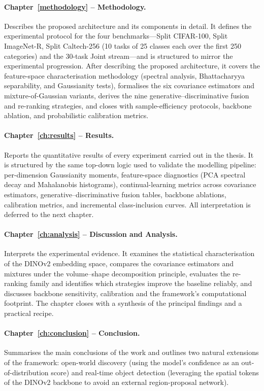 \paragraph{Chapter~\ref{methodology} -- Methodology.}
Describes the proposed architecture and its components in detail. It defines the experimental protocol for the four benchmarks---Split CIFAR-100, Split ImageNet-R, Split Caltech-256 (10 tasks of 25 classes each over the first 250 categories) and the 30-task Joint stream---and is structured to mirror the experimental progression. After describing the proposed architecture, it covers the feature-space characterisation methodology (spectral analysis, Bhattacharyya separability, and Gaussianity tests), formalises the six covariance estimators and mixture-of-Gaussian variants, derives the nine generative--discriminative fusion and re-ranking strategies, and closes with sample-efficiency protocols, backbone ablation, and probabilistic calibration metrics.

\paragraph{Chapter~\ref{ch:results} -- Results.}
Reports the quantitative results of every experiment carried out in the thesis. It is structured by the same top-down logic used to validate the modelling pipeline: per-dimension Gaussianity moments, feature-space diagnostics (PCA spectral decay and Mahalanobis histograms), continual-learning metrics across covariance estimators, generative--discriminative fusion tables, backbone ablations, calibration metrics, and incremental class-inclusion curves. All interpretation is deferred to the next chapter.

\paragraph{Chapter~\ref{ch:analysis} -- Discussion and Analysis.}
Interprets the experimental evidence. It examines the statistical characterisation of the DINOv2 embedding space, compares the covariance estimators and mixtures under the volume--shape decomposition principle, evaluates the re-ranking family and identifies which strategies improve the baseline reliably, and discusses backbone sensitivity, calibration and the framework's computational footprint. The chapter closes with a synthesis of the principal findings and a practical recipe.

\paragraph{Chapter~\ref{ch:conclusion} -- Conclusion.}
Summarises the main conclusions of the work and outlines two natural extensions of the framework: open-world discovery (using the model's confidence as an out-of-distribution score) and real-time object detection (leveraging the spatial tokens of the DINOv2 backbone to avoid an external region-proposal network).
